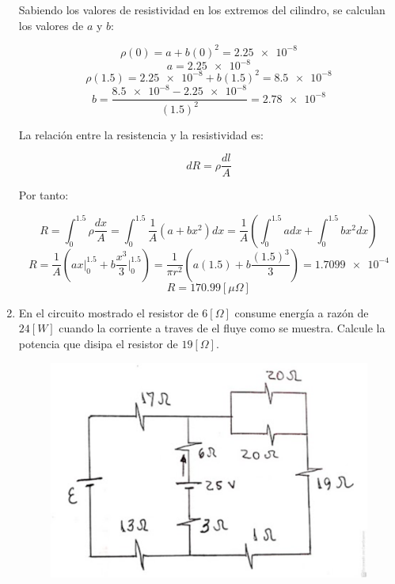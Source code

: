 \documentclass[letter,11pt]{article}
\begin{document}
\begin{enumerate}
Sabiendo los valores de resistividad en los extremos del cilindro, se calculan
los valores de $a$ y $b$:

\begin{equation*}
    \rho(0) = a+b(0)^2 = \num{2.25e-8}
\end{equation*}
\begin{equation*}
    a = \num{2.25e-8}
\end{equation*}
\begin{equation*}
    \rho(1.5) = \num{2.25e-8}+b(1.5)^2 = \num{8.5e-8}
\end{equation*}
\begin{equation*}
    b = \frac{\num{8.5e-8}-\num{2.25e-8}}{(1.5)^2} = \num{2.78e-8}
\end{equation*}

La relación entre la resistencia y la resistividad es:

\begin{equation*}
    dR = \rho\frac{dl}{A}
\end{equation*}

Por tanto:

\begin{equation*}
    R = \int_{0}^{1.5}\rho\frac{dx}{A}
      = \int_{0}^{1.5}\frac{1}{A}(a+bx^2)dx
      = \frac{1}{A}\left(\int_{0}^{1.5}a dx+\int_{0}^{1.5}bx^2 dx\right)
\end{equation*}
\begin{equation*}
    R = \frac{1}{A}\left(ax\Biggr|_{0}^{1.5}
        +b\frac{x^3}{3}\Biggr|_{0}^{1.5}\right)
      = \frac{1}{\pi r^2}\left(a(1.5)+b\frac{(1.5)^3}{3}\right)
      = \num{1.7099e-4}
\end{equation*}
\begin{equation*}
    R = 170.99 [\mu \Omega]
\end{equation*}

\item En el circuito mostrado el resistor de $6 [\Omega]$ consume energía a
razón de $24 [W]$ cuando la corriente a traves de el fluye como se muestra.
Calcule la potencia que disipa el resistor de $19 [\Omega]$.

\begin{figure}[!h]
\centering
\includegraphics[scale=0.70]{resources/q3.eps}
\end{figure}


\end{enumerate}
\end{document}
